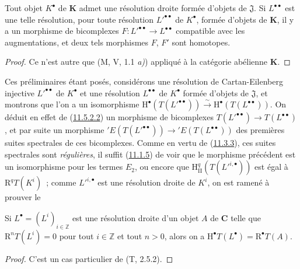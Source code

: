 \begin{corollary}[11.5.2.2]
\label{0.11.5.2.2-fr}
Tout objet $K^\bullet$ de $\boldsymbol{K}$ admet une résolution droite formée
d'objets de $\mathfrak J$. Si $L^{\bullet\bullet}$ est une telle résolution,
pour toute résolution $L'^{\bullet\bullet}$ de $K^\bullet$, formée d'objets
de $\boldsymbol{K}$, il y a un morphisme de bicomplexes
$F:L'^{\bullet\bullet}\to L^{\bullet\bullet}$ compatible avec les
augmentations, et deux tels morphismes $F$, $F'$ sont homotopes.
\end{corollary}

\begin{proof}
Ce n'est autre que (M, V, 1.1 \emph{a)}) appliqué à la catégorie abélienne
$\boldsymbol{K}$.
\end{proof}

\begin{env}[11.5.2.3]
\label{0.11.5.2.3-fr}
Ces préliminaires étant posés, considérons une résolution de
Cartan-Eilenberg injective $L'^{\bullet\bullet}$ de $K^\bullet$ et une
résolution $L^{\bullet\bullet}$ de $K^\bullet$ formée d'objets de
$\mathfrak J$, et montrons que l'on a un isomorphisme
$\mathrm H^\bullet(T(L'^{\bullet\bullet}))\xrightarrow{\sim}\mathrm H^\bullet(T(L^{\bullet\bullet}))$.
On déduit en effet de (\hyperref[0.11.5.2.2-fr]{11.5.2.2}) un morphisme de
bicomplexes $T(L'^{\bullet\bullet})\to T(L^{\bullet\bullet})$, et par suite
un morphisme
$'E(T(L'^{\bullet\bullet}))\to{}'E(T(L^{\bullet\bullet}))$ des premières
suites spectrales de ces bicomplexes. Comme en vertu de
(\hyperref[0.11.3.3-fr]{11.3.3}), ces suites spectrales sont \emph{régulières}, il
suffit (\hyperref[0.11.1.5-fr]{11.1.5}) de voir que le morphisme précédent est
un isomorphisme pour les termes $E_2$, ou encore que
$\mathrm H_{\mathrm{II}}^q(T(L'^{i,\bullet}))$ est égal à
$\mathrm R^qT(K^i)$~; comme $L'^{i,\bullet}$ est une résolution droite de
$K^i$, on est ramené à prouver le
\end{env}

\begin{lemma}[11.5.2.4]
\label{0.11.5.2.4-fr}
Si $L^\bullet=(L^i)_{i\in\mathbb Z}$ est une résolution droite d'un objet $A$
de $\boldsymbol{C}$ telle que $\mathrm R^nT(L^i)=0$ pour tout $i\in\mathbb Z$ et
tout $n>0$, alors on a
$\mathrm H^\bullet T(L^\bullet)=\mathrm R^\bullet T(A)$.
\end{lemma}

\begin{proof}
C'est un cas particulier de (T, 2.5.2).
\end{proof}

